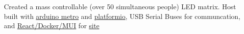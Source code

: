 {Created a mass controllable (over 50 simultaneous people) LED matrix. Host built with \href{https://www.adafruit.com/product/2488}{arduino metro} and \href{https://platformio.org/}{platformio}, USB Serial Buses for communcation, and \href{https://github.com/sachiniyer/control_display/tree/main/control_display_site}{React/Docker/MUI} for \href{https://school-demo.sachiniyer.com/}{site}}
